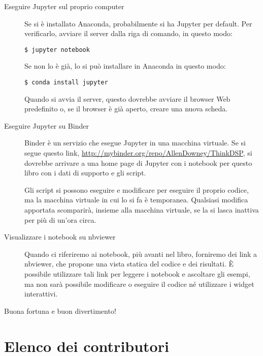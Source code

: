 \documentclass[12pt,a4paper]{book}
\begin{document}
\begin{description} 

\item[Eseguire Jupyter sul proprio computer]

Se si è installato Anaconda, probabilmente si ha Jupyter per default. Per verificarlo, avviare il server dalla riga di comando, in questo modo:

\begin{verbatim} 
$ jupyter notebook
 \end{verbatim} 

Se non lo è già, lo si può installare in Anaconda in questo modo:

\begin{verbatim} 
$ conda install jupyter
 \end{verbatim} 

Quando si avvia il server, questo dovrebbe avviare il browser Web predefinito o, se il browser è già aperto, creare una nuova scheda.

\item[Eseguire Jupyter su Binder]

Binder è un servizio che esegue Jupyter in una macchina virtuale. Se si segue questo link, \url{http://mybinder.org/repo/AllenDowney/ThinkDSP}, si dovrebbe arrivare a una home page di Jupyter con i notebook per questo libro con i dati di supporto e gli script.

Gli script si possono eseguire e modificare per eseguire il proprio codice, ma la macchina virtuale in cui lo si fa è temporanea. Qualsiasi modifica apportata scomparirà, insieme alla macchina virtuale, se la si lasca inattiva per più di un'ora circa.

\item[Visualizzare i notebook su nbviewer]

Quando ci riferiremo ai notebook, più avanti nel libro, forniremo dei link a nbviewer, che propone una vista statica del codice e dei risultati. È possibile utilizzare tali link per leggere i notebook e ascoltare gli esempi, ma non sarà possibile modificare o eseguire il codice né utilizzare i widget interattivi.

\end{description} 

Buona fortuna e buon divertimento!

\section*{Elenco dei contributori} 
\end{document}

